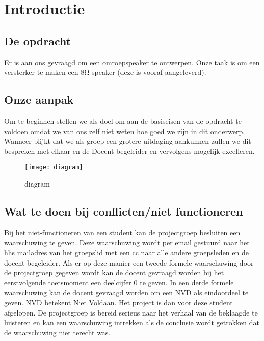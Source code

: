 \section{Introductie}
\subsection{De opdracht}
Er is aan ons gevraagd om een omroepspeaker te ontwerpen. Onze taak is om een versterker te maken een 8Ω speaker (deze is vooraf aangeleverd). 

\subsection{Onze aanpak}
Om te beginnen stellen we als doel om aan de basiseisen van de opdracht te voldoen omdat we van ons zelf niet weten hoe goed we zijn in dit onderwerp. Wanneer blijkt dat we als groep een grotere uitdaging aankunnen zullen we dit bespreken met elkaar en de Docent-begeleider en vervolgens mogelijk excelleren. 

\begin{figure}[h]
    \centering
    \texttt{[image: diagram]}
    \caption{diagram}
    \label{fig:diagram}
\end{figure}

\subsection{Wat te doen bij conflicten/niet functioneren}
Bij het niet-functioneren van een student kan de projectgroep besluiten een waarschuwing te geven. Deze waarschuwing wordt per email gestuurd naar het hhs mailadres van het groepslid met een cc naar alle andere groepsleden en de docent-begeleider.
Als er op deze manier een tweede formele waarschuwing door de projectgroep gegeven wordt kan de docent gevraagd worden bij het eerstvolgende toetsmoment een deelcijfer 0 te geven. In een derde formele waarschuwing kan de docent gevraagd worden om een NVD als eindoordeel te geven. NVD betekent Niet Voldaan. Het project is dan voor deze student afgelopen.
De projectgroep is bereid serieus naar het verhaal van de beklaagde te luisteren en kan een waarschuwing intrekken als de conclusie wordt getrokken dat de waarschuwing niet terecht was.
